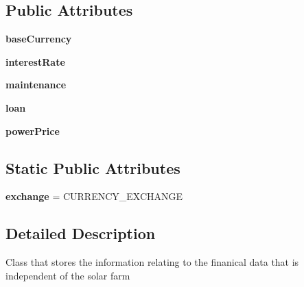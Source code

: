 \subsection*{Public Attributes}
\begin{DoxyCompactItemize}
\item 
\hypertarget{class_solar_calculator_1_1_assets_1_1_financial_a214d1f732fca019a7b8419b550de4194}{{\bfseries base\-Currency}}\label{class_solar_calculator_1_1_assets_1_1_financial_a214d1f732fca019a7b8419b550de4194}

\item 
\hypertarget{class_solar_calculator_1_1_assets_1_1_financial_a8774b0e3eefe97f76d4dae5ff79e0c3d}{{\bfseries interest\-Rate}}\label{class_solar_calculator_1_1_assets_1_1_financial_a8774b0e3eefe97f76d4dae5ff79e0c3d}

\item 
\hypertarget{class_solar_calculator_1_1_assets_1_1_financial_a8905d132e46912fce2d65a685ead611a}{{\bfseries maintenance}}\label{class_solar_calculator_1_1_assets_1_1_financial_a8905d132e46912fce2d65a685ead611a}

\item 
\hypertarget{class_solar_calculator_1_1_assets_1_1_financial_ab0d20c44eeb47ce89c8cba6b9600879f}{{\bfseries loan}}\label{class_solar_calculator_1_1_assets_1_1_financial_ab0d20c44eeb47ce89c8cba6b9600879f}

\item 
\hypertarget{class_solar_calculator_1_1_assets_1_1_financial_a46e2eef39d0c27211480cff91558df3d}{{\bfseries power\-Price}}\label{class_solar_calculator_1_1_assets_1_1_financial_a46e2eef39d0c27211480cff91558df3d}

\end{DoxyCompactItemize}
\subsection*{Static Public Attributes}
\begin{DoxyCompactItemize}
\item 
\hypertarget{class_solar_calculator_1_1_assets_1_1_financial_aa74ccfb020afbbaf53648a28e1e880a5}{{\bfseries exchange} = C\-U\-R\-R\-E\-N\-C\-Y\-\_\-\-E\-X\-C\-H\-A\-N\-G\-E}\label{class_solar_calculator_1_1_assets_1_1_financial_aa74ccfb020afbbaf53648a28e1e880a5}

\end{DoxyCompactItemize}


\subsection{Detailed Description}
\begin{DoxyVerb}Class that stores the information relating to the finanical data that is independent of the
solar farm \end{DoxyVerb}
 

